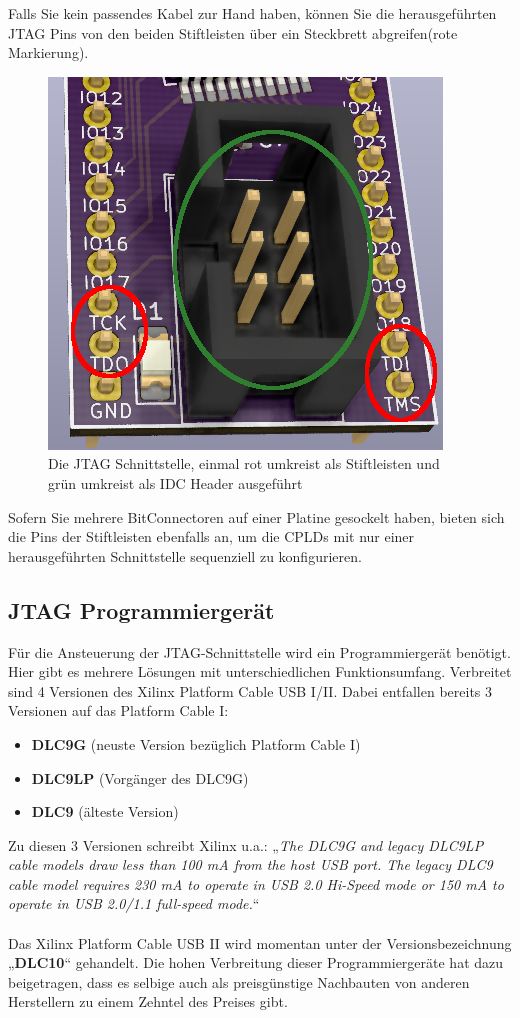 \documentclass{article}
\begin{document}
{\vspace{0.5cm}

\newpage

Falls Sie kein passendes Kabel zur Hand haben, können Sie die herausgeführten JTAG Pins von den beiden Stiftleisten über ein Steckbrett abgreifen(rote Markierung).

\begin{figure}[!h]
	\centering
	\includegraphics[width=0.4\linewidth]{Figures/JTAG_Pins}
	\caption{Die JTAG Schnittstelle, einmal rot umkreist als Stiftleisten und grün umkreist als IDC Header ausgeführt}
	\label{fig:JTAG_Pins}
\end{figure}

Sofern Sie mehrere BitConnectoren auf einer Platine gesockelt haben, bieten sich die Pins der Stiftleisten ebenfalls an, um die CPLDs mit nur einer herausgeführten Schnittstelle sequenziell zu konfigurieren.
\subsection{JTAG Programmiergerät}
Für die Ansteuerung der JTAG-Schnittstelle wird ein Programmiergerät benötigt. 
Hier gibt es mehrere Lösungen mit unterschiedlichen Funktionsumfang. Verbreitet sind 4 Versionen des Xilinx Platform Cable USB I/II. Dabei entfallen bereits 3 Versionen auf das Platform Cable I: 
\begin{itemize}
	\item \textbf{DLC9G} (neuste Version bezüglich Platform Cable I)
	\item \textbf{DLC9LP} (Vorgänger des DLC9G)
	\item \textbf{DLC9} (älteste Version)
\end{itemize}

\newpage

Zu diesen 3 Versionen schreibt Xilinx u.a.: „\textit{The DLC9G and legacy DLC9LP cable models draw less than 100 mA from the host USB port. The legacy DLC9 cable model requires 230 mA to operate in USB 2.0 Hi-Speed mode or 150 mA to operate in USB 2.0/1.1 full-speed mode.}“ \autocite[2]{Platform_Cable}\\\\
Das Xilinx Platform Cable USB II wird momentan unter der Versionsbezeichnung „\textbf{DLC10}“ gehandelt.
Die hohen Verbreitung dieser Programmiergeräte hat dazu beigetragen, dass es selbige auch als preisgünstige Nachbauten von anderen Herstellern zu einem Zehntel des Preises gibt.

}
\end{document}
